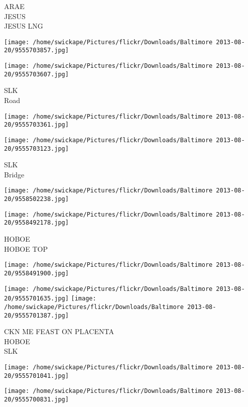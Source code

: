 \documentclass[10pt,letterpaper]{article}
\begin{document}
ARAE\\
JESUS\\
JESUS LNG\\
\pagebreak

\texttt{[image: /home/swickape/Pictures/flickr/Downloads/Baltimore 2013-08-20/9555703857.jpg]}

\vspace{0.25in}
\texttt{[image: /home/swickape/Pictures/flickr/Downloads/Baltimore 2013-08-20/9555703607.jpg]}

SLK\\
Road\\
\pagebreak

\texttt{[image: /home/swickape/Pictures/flickr/Downloads/Baltimore 2013-08-20/9555703361.jpg]}

\vspace{0.25in}
\texttt{[image: /home/swickape/Pictures/flickr/Downloads/Baltimore 2013-08-20/9555703123.jpg]}

SLK\\
Bridge\\
\pagebreak

\texttt{[image: /home/swickape/Pictures/flickr/Downloads/Baltimore 2013-08-20/9558502238.jpg]}

\vspace{0.25in}
\texttt{[image: /home/swickape/Pictures/flickr/Downloads/Baltimore 2013-08-20/9558492178.jpg]}

HOBOE\\
HOBOE TOP\\
\pagebreak

\texttt{[image: /home/swickape/Pictures/flickr/Downloads/Baltimore 2013-08-20/9558491900.jpg]}

\vspace{0.25in}
\texttt{[image: /home/swickape/Pictures/flickr/Downloads/Baltimore 2013-08-20/9555701635.jpg]}
\texttt{[image: /home/swickape/Pictures/flickr/Downloads/Baltimore 2013-08-20/9555701387.jpg]}

CKN ME FEAST ON PLACENTA\\
HOBOE\\
SLK\\
\pagebreak

\texttt{[image: /home/swickape/Pictures/flickr/Downloads/Baltimore 2013-08-20/9555701041.jpg]}

\vspace{0.25in}
\texttt{[image: /home/swickape/Pictures/flickr/Downloads/Baltimore 2013-08-20/9555700831.jpg]}
\end{document}
